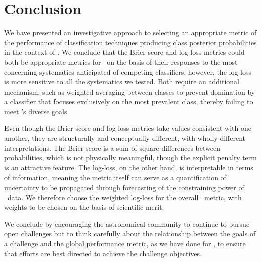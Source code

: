 \section{Conclusion}
\label{sec:conclusion}

We have presented an investigative approach to selecting an appropriate metric of the performance of classification techniques producing class posterior probabilities in the context of \plasticc.
We conclude that the Brier score and log-loss metrics could both be appropriate metrics for \plasticc\ on the basis of their responses to the most concerning systematics anticipated of competing classifiers, however, the log-loss is more sensitive to all the systematics we tested.
Both require an additional mechanism, such as weighted averaging between classes to prevent domination by a classifier that focuses exclusively on the most prevalent class, thereby failing to meet \plasticc's diverse goals.

Even though the Brier score and log-loss metrics take values consistent with one another, they are structurally and conceptually different, with wholly different interpretations.
The Brier score is a sum of square differences between probabilities, which is not physically meaningful, though the explicit penalty term is an attractive feature.
The log-loss, on the other hand, is interpretable in terms of information, meaning the metric itself can serve as a quantification of uncertainty to be propagated through forecasting of the constraining power of \lsst\ data.
We therefore choose the weighted log-loss for the overall \plasticc\ metric, with weights to be chosen on the basis of scientific merit.

We conclude by encouraging the astronomical community to continue to pursue open challenges but to think carefully about the relationship between the goals of a challenge and the global performance metric, as we have done for \plasticc, to ensure that efforts are best directed to achieve the challenge objectives.
